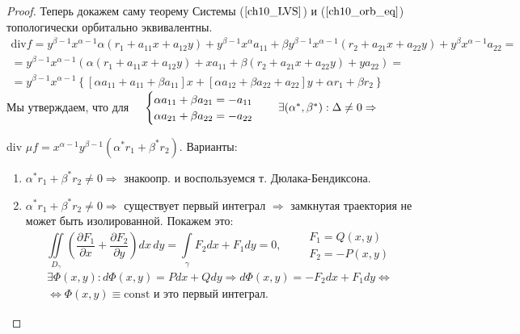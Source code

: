 \begin{proof}{ Теперь докажем саму теорему}
		Системы ($\ref{ch10_LVS}$) и ($\ref{ch10_orb_eq}$) топологически орбитально эквивалентны. 
		$$
		\begin{gathered}
			\textrm{div} f = y^{\beta-1} x^{\alpha-1}\alpha(r_1 + a_{11}x + a_{12}y) + 
										y^{\beta -1} x^{\alpha}a_{11} +
										\beta y^{\beta -1} x^{\alpha-1}(r_2 + a_{21}x + a_{22}y) + 
										y^{\beta} x^{\alpha-1} a_{22} = \\
			= y^{\beta-1} x^{\alpha-1} (\alpha (r_1 + a_{11}x + a_{12}y) 
							+ x a_{11} +\beta (r_2 + a_{21}x + a_{22}y) + y a_{22}) = \\
			= y^{\beta-1} x^{\alpha-1} \left\{ [\alpha a_{11}+ a_{11}+\beta a_{11} ]x +
								[\alpha a_{12} + \beta a_{22} + a_{22}]y + \alpha r_1+ \beta r_2 \right\}
		\end{gathered}
		$$
		Мы утверждаем, что для $\quad \begin{cases}
													\alpha a_{11} + \beta a_{21} = -a_{11} \\
													\alpha a_{21} + \beta a_{22} = -a_{22}
												\end{cases} \quad \exists(\alpha^*, \beta^*): \Delta \neq 0 \Rightarrow \quad
												\vspace{2mm}$\newline
												
		\textrm{div} $\mu f = x^{\alpha-1}y^{\beta -1}(\alpha^* r_1 + \beta^* r_2) $. Варианты:
		\begin{enumerate}
			\item $\alpha^* r_1 + \beta^* r_2 \neq 0 \Rightarrow$ знакоопр. и воспользуемся т. Дюлака-Бендиксона.
			\item $\alpha^* r_1 + \beta^* r_2 \neq 0 \Rightarrow$ существует первый интеграл $\Rightarrow$
					замкнутая траектория \newline не может быть изолированной. Покажем это:
					$$
						\iint\limits_{D_\gamma}\left( \dfrac{\partial F_1}{\partial x} + 
																		\dfrac{\partial F_2}{\partial y} \right)dx\,dy = 
						\int\limits_{\gamma} F_2 dx + F_1 dy = 0, \qquad 
						\begin{gathered}
							F_1 = Q(x,y)\\
							F_2 = -P(x,y)
						\end{gathered}
					$$
					$$
						\begin{gathered}
						\exists \Phi(x,y): d\Phi(x,y) = Pdx+Qdy \Rightarrow d\Phi(x,y) = -F_2dx+F_1dy \Leftrightarrow \\
							 \Leftrightarrow \Phi(x,y) \equiv \textrm{const} \text{ и это первый интеграл.}
						\end{gathered}
					$$
		\end{enumerate}
	\end{proof}

